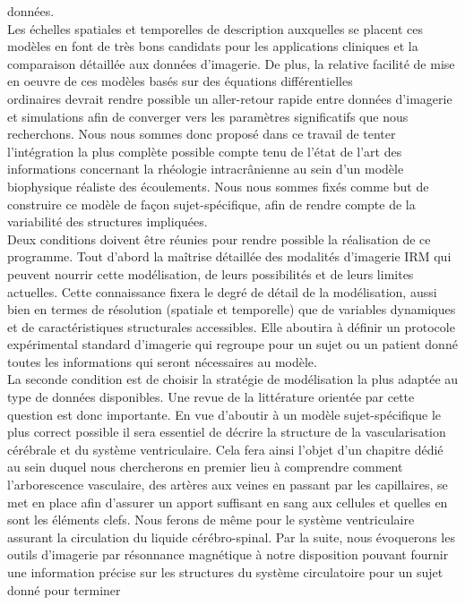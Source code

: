 données.\\
Les échelles spatiales et temporelles de description auxquelles se placent ces modèles en font de très bons candidats pour les applications cliniques et la comparaison détaillée aux données d'imagerie. 
De plus, la relative facilité de mise en oeuvre de ces modèles basés sur des équations différentielles\\
ordinaires devrait rendre possible un aller-retour rapide entre données d'imagerie et simulations afin de converger vers les paramètres significatifs que nous recherchons.
Nous nous sommes donc proposé dans ce travail de tenter l'intégration la plus complète possible compte tenu de l'état de l'art des informations concernant la rhéologie intracrânienne au sein 
d'un modèle biophysique réaliste des écoulements. Nous nous sommes fixés comme but de construire ce modèle de façon sujet-spécifique, afin de rendre compte de la variabilité des structures 
impliquées.\\
Deux conditions doivent être réunies pour rendre possible la réalisation de ce programme. Tout d'abord la maîtrise détaillée des modalités d'imagerie IRM qui peuvent nourrir cette modélisation, 
de leurs possibilités et de leurs limites actuelles. Cette connaissance fixera le degré de détail de la modélisation, aussi bien en termes de résolution (spatiale et temporelle) que de variables 
dynamiques et de caractéristiques structurales accessibles. Elle aboutira à définir un protocole expérimental standard d'imagerie qui regroupe pour un sujet ou un patient donné toutes les informations 
qui seront nécessaires au modèle.\\
La seconde condition est de choisir la stratégie de modélisation la plus adaptée au type de données disponibles. Une revue de la littérature orientée par cette question est donc importante.
En vue d’aboutir à un modèle sujet-spécifique le plus correct possible il sera essentiel de décrire la structure de la vascularisation cérébrale et du système ventriculaire. Cela fera ainsi l’objet 
d’un chapitre dédié au sein duquel nous chercherons en premier lieu à comprendre comment l’arborescence vasculaire, des artères aux veines en passant par les capillaires, se met en place afin d’assurer 
un apport suffisant en sang aux cellules et quelles en sont les éléments clefs. Nous ferons de même pour le système ventriculaire assurant la circulation du liquide cérébro-spinal. Par la suite, 
nous évoquerons les outils d’imagerie par résonnance magnétique à notre disposition pouvant fournir une information précise sur les structures du système circulatoire pour un sujet donné pour terminer 
